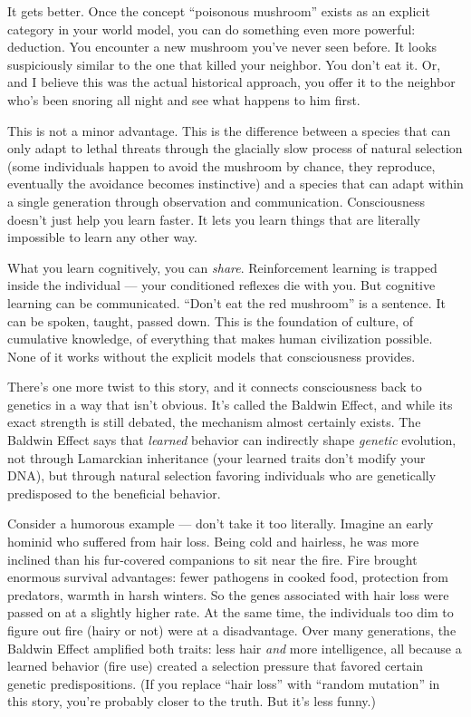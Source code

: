 \documentclass[11pt, twoside, openright]{book}
\begin{document}
It gets better. Once the concept ``poisonous mushroom'' exists as an explicit category in your world model, you can do something even more powerful: deduction. You encounter a new mushroom you've never seen before. It looks suspiciously similar to the one that killed your neighbor. You don't eat it. Or, and I believe this was the actual historical approach, you offer it to the neighbor who's been snoring all night and see what happens to him first.

This is not a minor advantage. This is the difference between a species that can only adapt to lethal threats through the glacially slow process of natural selection (some individuals happen to avoid the mushroom by chance, they reproduce, eventually the avoidance becomes instinctive) and a species that can adapt within a single generation through observation and communication. Consciousness doesn't just help you learn faster. It lets you learn things that are literally impossible to learn any other way.

What you learn cognitively, you can \textit{share}. Reinforcement learning is trapped inside the individual --- your conditioned reflexes die with you. But cognitive learning can be communicated. ``Don't eat the red mushroom'' is a sentence. It can be spoken, taught, passed down. This is the foundation of culture, of cumulative knowledge, of everything that makes human civilization possible. None of it works without the explicit models that consciousness provides.

There's one more twist to this story, and it connects consciousness back to genetics in a way that isn't obvious. It's called the Baldwin Effect, and while its exact strength is still debated, the mechanism almost certainly exists. The Baldwin Effect says that \textit{learned} behavior can indirectly shape \textit{genetic} evolution, not through Lamarckian inheritance (your learned traits don't modify your DNA), but through natural selection favoring individuals who are genetically predisposed to the beneficial behavior.

Consider a humorous example --- don't take it too literally. Imagine an early hominid who suffered from hair loss. Being cold and hairless, he was more inclined than his fur-covered companions to sit near the fire. Fire brought enormous survival advantages: fewer pathogens in cooked food, protection from predators, warmth in harsh winters. So the genes associated with hair loss were passed on at a slightly higher rate. At the same time, the individuals too dim to figure out fire (hairy or not) were at a disadvantage. Over many generations, the Baldwin Effect amplified both traits: less hair \textit{and} more intelligence, all because a learned behavior (fire use) created a selection pressure that favored certain genetic predispositions. (If you replace ``hair loss'' with ``random mutation'' in this story, you're probably closer to the truth. But it's less funny.)
\end{document}
